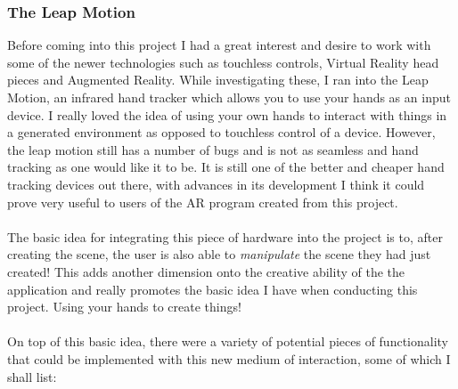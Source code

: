 \documentclass[11pt]{article}
\begin{document}
\subsubsection{The Leap Motion}
Before coming into this project I had a great interest and desire to work with
some of the newer technologies such as touchless controls, Virtual Reality 
head pieces and Augmented Reality. While investigating these, I ran into the
Leap Motion, an infrared hand tracker which allows you to use your hands as
an input device. I really loved the idea of using your own hands to interact
with things in a generated environment as opposed to touchless control of a device.
However, the leap motion still has a number of bugs and is not as seamless and 
hand tracking as one would like it to be. It is still one of the better and 
cheaper hand tracking devices out there, with advances in its development I think
it could prove very useful to users of the AR program created from this project.\\
\\
The basic idea for integrating this piece of hardware into the project is to,
after creating the scene, the user is also able to \textit{manipulate} the
scene they had just created! This adds another dimension onto the creative
ability of the the application and really promotes the basic idea I have when
conducting this project. Using your hands to create things! \\
\\
On top of this basic idea, there were a variety of potential pieces of 
functionality that could be implemented with this new medium of interaction, some
of which I shall list:
\end{document}

